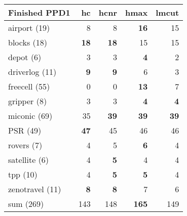     \begin{center}

        \begin{tabular}{l|r|r|r|r}
            Finished PPD1 & hc & hcnr & hmax & lmcut \\\hline
            airport (19) & 8 & 8 & \textbf{16} & 15\\\hline
            blocks (18) & \textbf{18} & \textbf{18} & 15 & 15 \\\hline
            depot (6) & 3 & 3 & \textbf{4} & 2 \\\hline
            driverlog (11) & \textbf{9} & \textbf{9} & 6 & 3 \\\hline
            freecell (55) & 0 & 0 & \textbf{13} & 7 \\\hline
            gripper (8) & 3 & 3 & \textbf{4} & \textbf{4} \\\hline
            miconic (69) & 35 & \textbf{39} & \textbf{39} & \textbf{39} \\\hline
            PSR (49) & \textbf{47} & 45 & 46 & 46 \\\hline
            rovers (7) & 4 & 5 & \textbf{6} & 4 \\\hline
            satellite (6) & 4 & \textbf{5} & 4 & 4 \\\hline
            tpp (10) & 4 & \textbf{5} & \textbf{5} & 4 \\\hline
            zenotravel (11) & \textbf{8} & \textbf{8} & 7 & 6 \\\hline\hline
            sum (269) & 143 & 148 & \textbf{165} & 149 \\
        \end{tabular}

        \scriptsize
        \\
        \\
        \\
        \\
        \\
        
    \end{center}
   